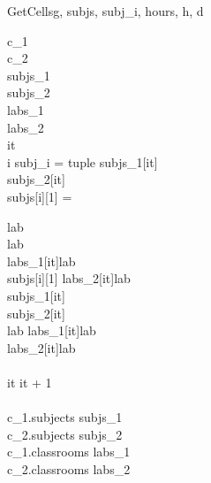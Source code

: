 \begin{pseudocode}{GetCells}{g, subjs, subj_i, hours, h, d}
\label{getcells}

c_1 \GETS {}\\
c_2 \GETS {}\\

subjs_1 \GETS {}\\
subjs_2 \GETS {}\\

labs_1 \GETS {}\\
labs_2 \GETS {}\\

it \\

\FOREACH i \in subj_i
\BEGIN
  \IF {} = tuple \THEN
  \BEGIN
    subjs_1[it] \GETS {}\\
    subjs_2[it] \GETS {}\\
  
    \IF subjs[i][1] =  \THEN
    
      lab \GETS {}\\
    \ELSE
      lab \GETS {}\\

    labs_1[it]\GETS lab\\

    \IF subjs[i][1] \neq {} \THEN
      labs_2[it]\GETS lab\\      
  \END
  \ELSE 
  \BEGIN
    subjs_1[it] \GETS {}\\
    subjs_2[it] \GETS {}\\
    lab \GETS {}
    labs_1[it]\GETS lab\\
    labs_2[it]\GETS lab\\    
  \END\\
  it \GETS it + 1\\
\END\\

c_1.subjects \GETS subjs_1\\
c_2.subjects \GETS subjs_2\\
c_1.classrooms \GETS labs_1\\
c_2.classrooms \GETS labs_2\\

\end{pseudocode}

